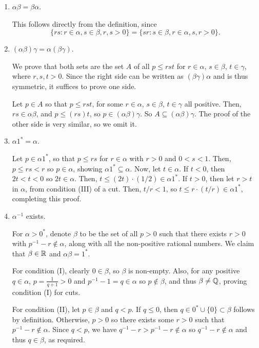 \begin{enumerate}[Step 1.]
\begin{enumerate}[({M}1)]
\item $\alpha \beta = \beta \alpha$.

This follows directly from the definition, since
\[
	\{rs: r \in \alpha, s \in \beta, r, s > 0\} = \{sr: s \in \beta, r \in \alpha, s, r > 0\}.
\]

\item $(\alpha \beta) \gamma = \alpha (\beta \gamma)$.

We prove that both sets are the set $A$ of all $p \le rst$ for $r \in \alpha$, $s \in \beta$, $t \in \gamma$, where $r, s, t > 0$. Since the right side can be written as $(\beta \gamma) \alpha$ and is thus symmetric, it suffices to prove one side.

Let $p \in A$ so that $p \le rst$, for some $r \in \alpha$, $s \in \beta$, $t \in \gamma$ all positive. Then, $rs \in \alpha\beta$, and $p \le (rs)t$, so $p \in (\alpha \beta) \gamma$. So $A \subseteq (\alpha \beta) \gamma$. The proof of the other side is very similar, so we omit it.

\item $\alpha 1^* = \alpha$.

Let $p \in \alpha 1^*$, so that $p \le rs$ for $r \in \alpha$ with $r > 0$ and $0 < s < 1$. Then, $p \le rs < r$ so $ p \in \alpha$, showing $\alpha 1^* \subseteq \alpha$. Now, let $t \in \alpha$. If $t < 0$, then $2t < t < 0$ so $2t \in \alpha$. Then, $t \le (2t) \cdot (1/2) \in \alpha 1^*$. If $t > 0$, then let $r > t$ in $\alpha$, from condition (III) of a cut. Then, $t/r < 1$, so $t \le r \cdot (t/r) \in \alpha 1^*$, completing this proof.

\item $\alpha^{-1}$ exists.

For $\alpha > 0^*$, denote $\beta$ to be the set of all $p > 0$ such that there exists $r > 0$ with $p^{-1} - r \not\in \alpha$, along with all the non-positive rational numbers. We claim that $\beta \in \mathbb{R}$ and $\alpha\beta = 1^*$.

For condition (I), clearly $0 \in \beta$, so $\beta$ is non-empty. Also, for any positive $q \in \alpha$, $p = \frac{1}{q + 1} > 0$ and $p^{-1} - 1 = q \in \alpha$ so $p \not\in \beta$, and thus $\beta \ne \mathbb{Q}$, proving condition (I) for cuts. 

For condition (II), let $p \in \beta$ and $q < p$. If $q \le 0$, then $q \in 0^* \cup \{0\} \subset\beta$ follows by definition. Otherwise, $p > 0$ so there exists some $r > 0$ such that $p^{-1} - r \not\in \alpha$. Since $q < p$, we have $q^{-1} - r > p^{-1} - r \not\in \alpha$ so $q^{-1} - r \not\in \alpha$ and thus $q \in \beta$, as required. 


\end{enumerate}
\end{enumerate}

